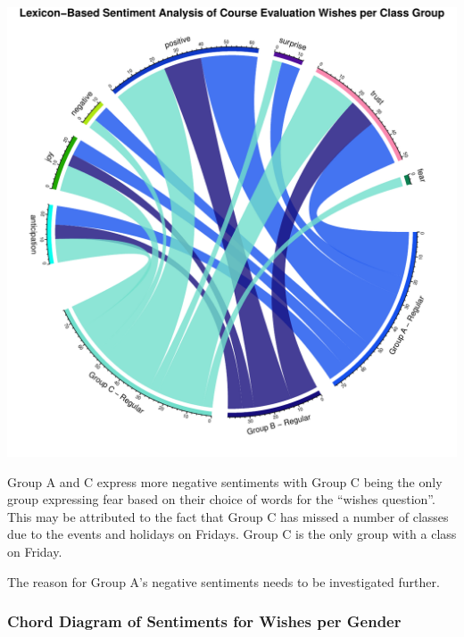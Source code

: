 \documentclass[
]{article}
\begin{document}
\includegraphics{Mid-SemesterCourseEvaluation-20240819-20241125-ADB-BBIT2.2_files/figure-latex/ChordDiagramPerGroup_Wishes-1.pdf}

Group A and C express more negative sentiments with Group C being the
only group expressing fear based on their choice of words for the
``wishes question''. This may be attributed to the fact that Group C has
missed a number of classes due to the events and holidays on Fridays.
Group C is the only group with a class on Friday.

The reason for Group A's negative sentiments needs to be investigated
further.

\newpage

\subsubsection{Chord Diagram of Sentiments for Wishes per
Gender}\label{chord-diagram-of-sentiments-for-wishes-per-gender}
\end{document}
